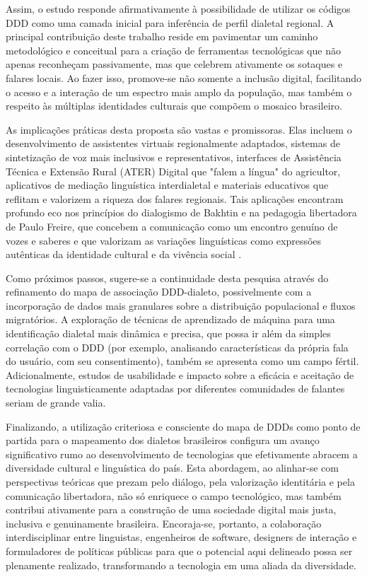 Assim, o estudo responde afirmativamente à possibilidade de utilizar os códigos DDD como uma camada inicial para inferência de perfil dialetal regional. A principal contribuição deste trabalho reside em pavimentar um caminho metodológico e conceitual para a criação de ferramentas tecnológicas que não apenas reconheçam passivamente, mas que celebrem ativamente os sotaques e falares locais. Ao fazer isso, promove-se não somente a inclusão digital, facilitando o acesso e a interação de um espectro mais amplo da população, mas também o respeito às múltiplas identidades culturais que compõem o mosaico brasileiro.

As implicações práticas desta proposta são vastas e promissoras. Elas incluem o desenvolvimento de assistentes virtuais regionalmente adaptados, sistemas de sintetização de voz mais inclusivos e representativos, interfaces de Assistência Técnica e Extensão Rural (ATER) Digital que "falem a língua" do agricultor, aplicativos de mediação linguística interdialetal e materiais educativos que reflitam e valorizem a riqueza dos falares regionais. Tais aplicações encontram profundo eco nos princípios do dialogismo de Bakhtin e na pedagogia libertadora de Paulo Freire, que concebem a comunicação como um encontro genuíno de vozes e saberes e que valorizam as variações linguísticas como expressões autênticas da identidade cultural e da vivência social \cite{bakhtin1997estetica, freire2005pedagogia, freire2013extensao}.

Como próximos passos, sugere-se a continuidade desta pesquisa através do refinamento do mapa de associação DDD-dialeto, possivelmente com a incorporação de dados mais granulares sobre a distribuição populacional e fluxos migratórios. A exploração de técnicas de aprendizado de máquina para uma identificação dialetal mais dinâmica e precisa, que possa ir além da simples correlação com o DDD (por exemplo, analisando características da própria fala do usuário, com seu consentimento), também se apresenta como um campo fértil. Adicionalmente, estudos de usabilidade e impacto sobre a eficácia e aceitação de tecnologias linguisticamente adaptadas por diferentes comunidades de falantes seriam de grande valia.

Finalizando, a utilização criteriosa e consciente do mapa de DDDs como ponto de partida para o mapeamento dos dialetos brasileiros configura um avanço significativo rumo ao desenvolvimento de tecnologias que efetivamente abracem a diversidade cultural e linguística do país. Esta abordagem, ao alinhar-se com perspectivas teóricas que prezam pelo diálogo, pela valorização identitária e pela comunicação libertadora, não só enriquece o campo tecnológico, mas também contribui ativamente para a construção de uma sociedade digital mais justa, inclusiva e genuinamente brasileira. Encoraja-se, portanto, a colaboração interdisciplinar entre linguistas, engenheiros de software, designers de interação e formuladores de políticas públicas para que o potencial aqui delineado possa ser plenamente realizado, transformando a tecnologia em uma aliada da diversidade.
